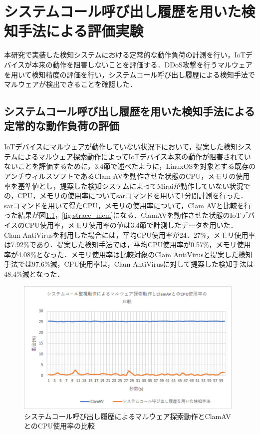 \chapter{システムコール呼び出し履歴を用いた検知手法による評価実験}
本研究で実装した検知システムにおける定常的な動作負荷の計測を行い，IoTデバイスが本来の動作を阻害しないことを評価する．DDoS攻撃を行うマルウェアを用いて検知精度の評価を行い，システムコール呼び出し履歴による検知手法でマルウェアが検出できることを確認した．

\section{システムコール呼び出し履歴を用いた検知手法による定常的な動作負荷の評価}

IoTデバイスにマルウェアが動作していない状況下において，提案した検知システムによるマルウェア探索動作によってIoTデバイス本来の動作が阻害されていないことを評価するために，3.4節で述べたように，LinuxOSを対象とする既存のアンチウィルスソフトであるClam AVを動作させた状態のCPU，メモリの使用率を基準値とし，提案した検知システムによってMiraiが動作していない状況での，CPU，メモリの使用率についてsarコマンドを用いて1分間計測を行った．
sarコマンドを用いて得たCPU，メモリの使用率について，Clam AVと比較を行った結果が図\ref{fig:strace_cpu}，\ref{fig:strace_mem}になる．ClamAVを動作させた状態のIoTデバイスのCPU使用率，メモリ使用率の値は3.4節で計測したデータを用いた．
Clam AntiVirusを利用した場合には，平均CPU使用率が24．27\%，メモリ使用率は7.92\%であり．提案した検知手法では，平均CPU使用率が0.57\%，メモリ使用率が4.08\%となった．メモリ使用率は比較対象のClam AntiVirusと提案した検知手法では97.6\%減，CPU使用率は，Clam AntiVirusに対して提案した検知手法は48.4\%減となった．


\clearpage
\begin{figure}[h]
    \centering
       \includegraphics[width=110mm]{figures/strace_cpu.eps}
    \caption{システムコール呼び出し履歴によるマルウェア探索動作とClamAVとのCPU使用率の比較}
        \label{fig:strace_cpu}
\end{figure}
  
